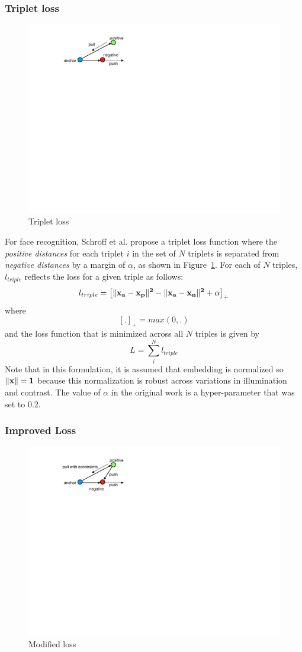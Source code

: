 \subsubsection{Triplet loss}

\begin{figure}
\includegraphics[width=0.5\linewidth]{schroff_triplet}
\caption{Triplet loss}
\label{schroff_loss}
\end{figure}

For face recognition, Schroff et al. \cite{DBLP:conf/cvpr/SchroffKP15} propose a triplet loss function where the \textit{positive distances} for each triplet $i$ in the set of $N$ triplets is separated from \textit{negative distances} by a margin of $\alpha$, as shown in Figure~\ref{schroff_loss}.  For each of $N$ triples, $l_{triple}$ reflects the loss for a given triple as follows:
\begin{equation}
  l_{triple} =  \left[\|\bf{x_a} - \bf{x_p}\|^2 - \|\bf{x_a} -\bf{x_n}\|^2 + \alpha \right]_+
\label{schroff}
\end{equation}
where
\begin{equation}
 \left[.\right]_{+} = max(0, .)
\end{equation}
and the loss function that is minimized across all $N$ triples is given by
\begin{equation}
 L = \sum_{i}^{N} l_{triple}
\end{equation}
Note that in this formulation, it is assumed that embedding is normalized so $\|\bf{x} \| = 1$ because this normalization is robust across variations in illumination and contrast.  The value of $\alpha$ in the original work is a hyper-parameter that \cite{DBLP:conf/cvpr/SchroffKP15} was set to 0.2.

\subsubsection{Improved Loss}

\begin{figure}
\includegraphics[width=0.5\linewidth]{modified_loss}
\caption{Modified loss}
\label{modified_loss}
\end{figure}

